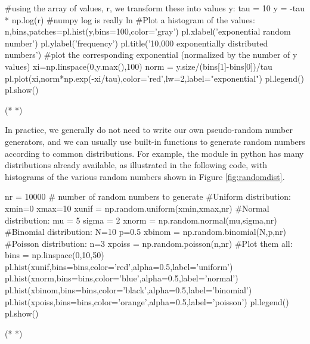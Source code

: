 \begin{python}[caption = Converting uniform PRNs to exponential PRNs] 
#using the array of values, r, we transform these into values y:
tau = 10
y = -tau * np.log(r) #numpy log is really ln
#Plot a histogram of the values:
n,bins,patches=pl.hist(y,bins=100,color='gray')
pl.xlabel('exponential random number')
pl.ylabel('frequency')
pl.title('10,000 exponentially distributed numbers')
#plot the corresponding exponential (normalized by the number of y values)
xi=np.linspace(0,y.max(),100)
norm = y.size/(bins[1]-bins[0])/tau
pl.plot(xi,norm*np.exp(-xi/tau),color='red',lw=2,label="exponential")
pl.legend()
pl.show()
\end{python}
\begin{poutput}
(*  *)
\end{poutput}

In practice, we generally do not need to write our own pseudo-random number generators, and we can usually use built-in functions to generate random numbers according to common distributions. For example, the  module in python has many distributions already available, as illustrated in the following code, with histograms of the various random numbers shown in Figure \ref{fig:randomdist}.
\begin{python}[caption = Standard distributions of PRNs] 
nr = 10000 # number of random numbers to generate
#Uniform distribution:
xmin=0
xmax=10
xunif = np.random.uniform(xmin,xmax,nr)
#Normal distribution:
mu = 5
sigma = 2
xnorm = np.random.normal(mu,sigma,nr)
#Binomial distribution:
N=10
p=0.5
xbinom = np.random.binomial(N,p,nr)
#Poisson distribution:
n=3
xpoiss = np.random.poisson(n,nr)
#Plot them all:
bins = np.linspace(0,10,50)
pl.hist(xunif,bins=bins,color='red',alpha=0.5,label='uniform')
pl.hist(xnorm,bins=bins,color='blue',alpha=0.5,label='normal')
pl.hist(xbinom,bins=bins,color='black',alpha=0.5,label='binomial')
pl.hist(xpoiss,bins=bins,color='orange',alpha=0.5,label='poisson')
pl.legend()
pl.show()
\end{python}
\begin{poutput}
(*  *)
\end{poutput}

